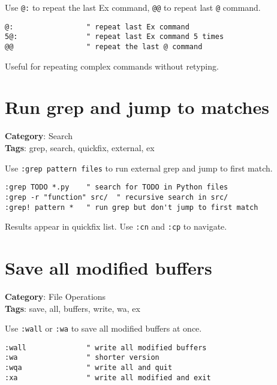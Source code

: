 {{{{{{Use {\footnotesize \Verb§@:§} to repeat the last Ex command, {\footnotesize \Verb§@@§} to repeat last {\footnotesize \Verb§@§} command.

\begin{Exa*}{}
\begin{Verbatim}[fontsize=\footnotesize, breaklines, breakanywhere]
@:                 " repeat last Ex command
5@:                " repeat last Ex command 5 times
@@                 " repeat the last @ command
\end{Verbatim}
\end{Exa*}

Useful for repeating complex commands without retyping.

\section{Run grep and jump to matches}

\textbf{Category}: Search\\ \textbf{Tags}: grep, search, quickfix, external, ex
\vspace{0.5cm}

Use {\footnotesize \Verb§:grep pattern files§} to run external grep and jump to first match.

\begin{Exa*}{}
\begin{Verbatim}[fontsize=\footnotesize, breaklines, breakanywhere]
:grep TODO *.py    " search for TODO in Python files
:grep -r "function" src/  " recursive search in src/
:grep! pattern *   " run grep but don't jump to first match
\end{Verbatim}
\end{Exa*}

Results appear in quickfix list. Use {\footnotesize \Verb§:cn§} and {\footnotesize \Verb§:cp§} to navigate.

\section{Save all modified buffers}

\textbf{Category}: File Operations\\ \textbf{Tags}: save, all, buffers, write, wa, ex
\vspace{0.5cm}

Use {\footnotesize \Verb§:wall§} or {\footnotesize \Verb§:wa§} to save all modified buffers at once.

\begin{Exa*}{}
\begin{Verbatim}[fontsize=\footnotesize, breaklines, breakanywhere]
:wall              " write all modified buffers
:wa                " shorter version
:wqa               " write all and quit
:xa                " write all modified and exit
\end{Verbatim}
\end{Exa*}

}}}}}}
